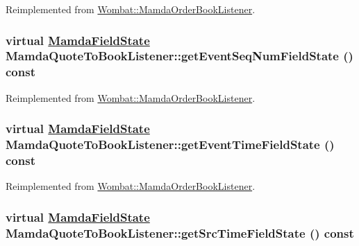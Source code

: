 Reimplemented from \hyperlink{classWombat_1_1MamdaOrderBookListener_0ebeb44c9a22a8d459b075f0afcd0f69}{Wombat::Mamda\-Order\-Book\-Listener}.\hypertarget{classMamdaQuoteToBookListener_fea891c59bf8468fd07df1730f95399b}{
\subsubsection[getEventSeqNumFieldState]{\setlength{\rightskip}{0pt plus 5cm}virtual \hyperlink{namespaceWombat_93aac974f2ab713554fd12a1fa3b7d2a}{Mamda\-Field\-State} Mamda\-Quote\-To\-Book\-Listener::get\-Event\-Seq\-Num\-Field\-State () const}}
\label{classMamdaQuoteToBookListener_fea891c59bf8468fd07df1730f95399b}




Reimplemented from \hyperlink{classWombat_1_1MamdaOrderBookListener_f48b72f5bed1a318a9487cffaf965d79}{Wombat::Mamda\-Order\-Book\-Listener}.\hypertarget{classMamdaQuoteToBookListener_25e9bef42468b7b169032cb6e2c330c8}{
\subsubsection[getEventTimeFieldState]{\setlength{\rightskip}{0pt plus 5cm}virtual \hyperlink{namespaceWombat_93aac974f2ab713554fd12a1fa3b7d2a}{Mamda\-Field\-State} Mamda\-Quote\-To\-Book\-Listener::get\-Event\-Time\-Field\-State () const}}
\label{classMamdaQuoteToBookListener_25e9bef42468b7b169032cb6e2c330c8}




Reimplemented from \hyperlink{classWombat_1_1MamdaOrderBookListener_ff57a8efade5c642a3d871debb2cd056}{Wombat::Mamda\-Order\-Book\-Listener}.\hypertarget{classMamdaQuoteToBookListener_681cac13c95fbc304bc6a9432e3319fe}{
\subsubsection[getSrcTimeFieldState]{\setlength{\rightskip}{0pt plus 5cm}virtual \hyperlink{namespaceWombat_93aac974f2ab713554fd12a1fa3b7d2a}{Mamda\-Field\-State} Mamda\-Quote\-To\-Book\-Listener::get\-Src\-Time\-Field\-State () const}}
\label{classMamdaQuoteToBookListener_681cac13c95fbc304bc6a9432e3319fe}




